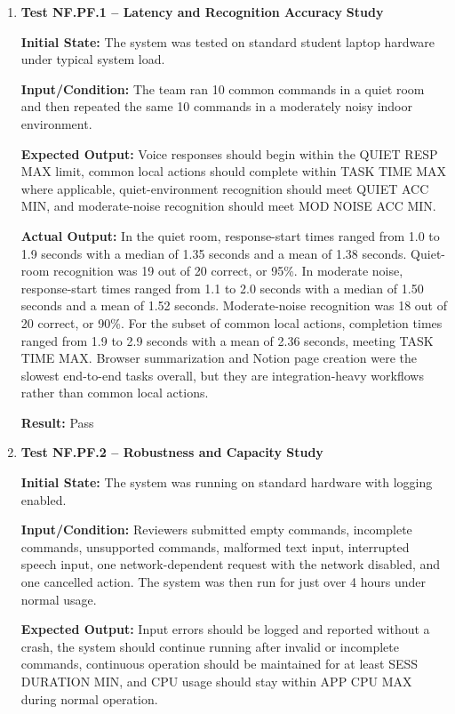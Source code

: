 \documentclass[12pt]{article}
\begin{document}
\begin{enumerate}
    \item \textbf{Test NF.PF.1 -- Latency and Recognition Accuracy}
    \textbf{Study}
    
    \textbf{Initial State:} The system was tested on standard student
    laptop hardware under typical system load.
    
    \textbf{Input/Condition:} The team ran 10 common commands in a
    quiet room and then repeated the same 10 commands in a moderately
    noisy indoor environment.
    
    \textbf{Expected Output:} Voice responses should begin within the
    QUIET RESP MAX limit, common local actions should complete within
    TASK TIME MAX where applicable, quiet-environment recognition
    should meet QUIET ACC MIN, and moderate-noise recognition should
    meet MOD NOISE ACC MIN.
    
    \textbf{Actual Output:} In the quiet room, response-start times
    ranged from 1.0 to 1.9 seconds with a median of 1.35 seconds and a
    mean of 1.38 seconds. Quiet-room recognition was 19 out of 20
    correct, or 95\%. In moderate noise, response-start times ranged
    from 1.1 to 2.0 seconds with a median of 1.50 seconds and a mean of
    1.52 seconds. Moderate-noise recognition was 18 out of 20 correct,
    or 90\%. For the subset of common local actions, completion times
    ranged from 1.9 to 2.9 seconds with a mean of 2.36 seconds, meeting
    TASK TIME MAX. Browser summarization and Notion page creation were
    the slowest end-to-end tasks overall, but they are integration-heavy
    workflows rather than common local actions.
    
    \textbf{Result:} Pass

    \item \textbf{Test NF.PF.2 -- Robustness and Capacity Study}
    
    \textbf{Initial State:} The system was running on standard
    hardware with logging enabled.
    
    \textbf{Input/Condition:} Reviewers submitted empty commands,
    incomplete commands, unsupported commands, malformed text input,
    interrupted speech input, one network-dependent request with the
    network disabled, and one cancelled action. The system was then
    run for just over 4 hours under normal usage.
    
    \textbf{Expected Output:} Input errors should be logged and
    reported without a crash, the system should continue running after
    invalid or incomplete commands, continuous operation should be
    maintained for at least SESS DURATION MIN, and CPU usage should
    stay within APP CPU MAX during normal operation.
    

\end{enumerate}
\end{document}
